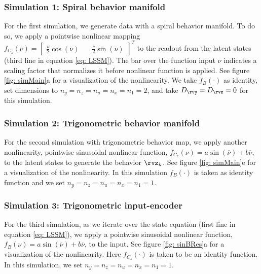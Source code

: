 \documentclass{article} %
\begin{document}
\subsubsection{Simulation 1: Spiral behavior manifold}
For the first simulation, we generate data with a spiral behavior manifold. To do so, we apply a pointwise nonlinear mapping $f_{C_z}(\nu)=\begin{bmatrix}\frac{\overline{\nu}}{2}\cos(\overline{\nu})  & \quad \frac{\overline{\nu}}{2}\sin(\overline{\nu})\end{bmatrix}^T$ to the readout from the latent states (third line in equation \ref{eq: LSSM}).  The bar over the function input $\nu$ indicates a scaling factor that normalizes it before nonlinear function is applied. See figure \ref{fig: simMain}a for a visualization of the nonlinearity. We take $f_B(\cdot)$ as identity, set dimensions to $n_y=n_z=n_u=n_x=n_1=2$, and take $D_\rvy=D_\rvz=0$ for this simulation.

\subsubsection{Simulation 2: Trigonometric behavior manifold}\label{app: sim_2_method}
For the second simulation with trigonometric behavior map, we apply another nonlinearity, pointwise sinusoidal nonlinear function, $f_{C_z}(\nu)=a\sin(\overline{\nu}) + b\overline{\nu}$, to the latent states to generate the behavior $\rvz_{k}$. See figure \ref{fig: simMain}e for a visualization of the nonlinearity. In this simulation $f_B(\cdot)$ is taken as identity function and we set $n_y=n_z=n_u=n_x=n_1=1$.

\subsubsection{Simulation 3: Trigonometric input-encoder}
For the third simulation, as we iterate over the state equation  (first line in equation \ref{eq: LSSM}), we apply a pointwise sinusoidal nonlinear function, $f_B(\nu)=a\sin(\overline{\nu}) + b\overline{\nu}$, to the input. See figure \ref{fig: sinBRes}a for a visualization of the nonlinearity. Here $f_{C_z}(\cdot)$ is taken to be an identity function. In this simulation, we set $n_y=n_z=n_u=n_x=n_1=1$. 
\end{document}
